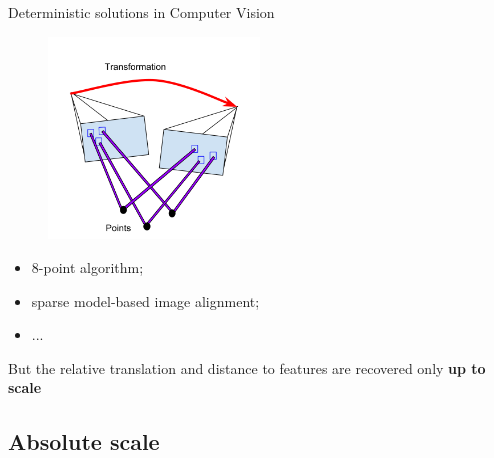 \documentclass{beamer}
\begin{document}
\begin{frame}{Deterministic solutions in Computer Vision}

\begin{figure}
\centering
\includegraphics[width=0.5\textwidth]{images/directMethod.png}
\end{figure}

\begin{itemize}
\item 8-point algorithm;
\item sparse model-based image alignment;
\item ...
\end{itemize}


But the relative translation and distance to features are recovered only \textbf{up to scale}

\end{frame}

\subsection{Absolute scale}
\end{document}
